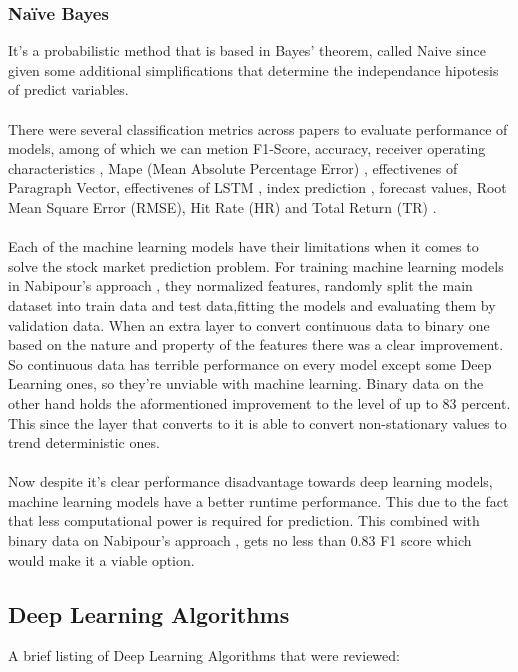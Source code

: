 \documentclass[conference]{IEEEtran}
\begin{document}
\subsubsection{Naïve Bayes}
It's a probabilistic method that is based in Bayes' theorem, called Naive since given some additional simplifications that determine
the independance hipotesis of predict variables.
\\\\
There were several classification metrics across papers to evaluate performance of models,
among of which we can metion F1-Score, accuracy, receiver operating characteristics \cite{nabipour2020predicting},
Mape (Mean Absolute Percentage Error) \cite{M2018}, effectivenes of Paragraph Vector, effectivenes of LSTM \cite{Akita2016}, index prediction \cite{Vargas2017},
forecast values, Root Mean Square Error (RMSE), Hit Rate (HR) and Total Return (TR) \cite{Singh2016}.
\\\\
Each of the machine learning models have their limitations when it comes to solve the stock market prediction problem.
For training machine learning models in Nabipour's approach \cite{nabipour2020predicting}, they normalized features, randomly split 
the main dataset into train data and test data,fitting the models and evaluating them by validation data. When an extra layer to convert continuous data to binary
one based on the nature and property of the features there was a clear improvement. So continuous data has terrible performance on every model except some Deep Learning ones, so they're unviable with machine learning. Binary data on the other hand holds the aformentioned
improvement to the level of up to 83 percent. This since the layer that converts to it is able to convert non-stationary values to trend deterministic ones.
\\\\
Now despite it's clear performance disadvantage towards deep learning models, machine learning models have a better runtime performance. This due to the fact
that less computational power is required for prediction. This combined with binary data on Nabipour's approach \cite{nabipour2020predicting}, gets no less than 0.83 F1 score which would make it
a viable option.



\subsection{Deep Learning Algorithms}
A brief listing of Deep Learning Algorithms that were reviewed:
\end{document}
